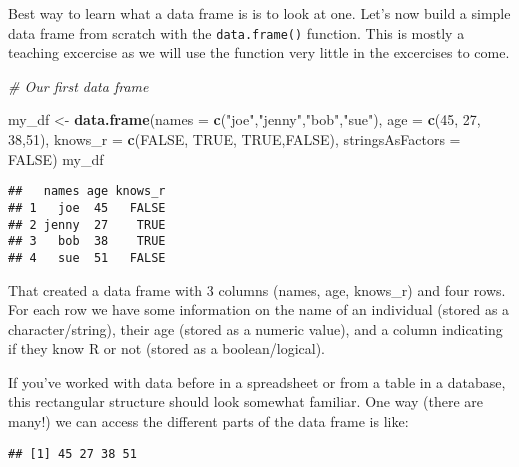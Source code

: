 \documentclass[]{article}
\newenvironment{Shaded}{\begin{snugshade}}{\end{snugshade}}
\newcommand{\CommentTok}[1]{\textcolor[rgb]{0.56,0.35,0.01}{\textit{#1}}}
\newcommand{\DataTypeTok}[1]{\textcolor[rgb]{0.13,0.29,0.53}{#1}}
\newcommand{\DecValTok}[1]{\textcolor[rgb]{0.00,0.00,0.81}{#1}}
\newcommand{\KeywordTok}[1]{\textcolor[rgb]{0.13,0.29,0.53}{\textbf{#1}}}
\newcommand{\NormalTok}[1]{#1}
\newcommand{\OperatorTok}[1]{\textcolor[rgb]{0.81,0.36,0.00}{\textbf{#1}}}
\newcommand{\OtherTok}[1]{\textcolor[rgb]{0.56,0.35,0.01}{#1}}
\newcommand{\StringTok}[1]{\textcolor[rgb]{0.31,0.60,0.02}{#1}}
\begin{document}
Best way to learn what a data frame is is to look at one. Let's now
build a simple data frame from scratch with the \texttt{data.frame()}
function. This is mostly a teaching excercise as we will use the
function very little in the excercises to come.

\begin{Shaded}
\begin{Highlighting}[]
\CommentTok{# Our first data frame}

\NormalTok{my_df <-}\StringTok{ }\KeywordTok{data.frame}\NormalTok{(}\DataTypeTok{names =} \KeywordTok{c}\NormalTok{(}\StringTok{"joe"}\NormalTok{,}\StringTok{"jenny"}\NormalTok{,}\StringTok{"bob"}\NormalTok{,}\StringTok{"sue"}\NormalTok{), }
                    \DataTypeTok{age =} \KeywordTok{c}\NormalTok{(}\DecValTok{45}\NormalTok{, }\DecValTok{27}\NormalTok{, }\DecValTok{38}\NormalTok{,}\DecValTok{51}\NormalTok{), }
                    \DataTypeTok{knows_r =} \KeywordTok{c}\NormalTok{(}\OtherTok{FALSE}\NormalTok{, }\OtherTok{TRUE}\NormalTok{, }\OtherTok{TRUE}\NormalTok{,}\OtherTok{FALSE}\NormalTok{), }
                    \DataTypeTok{stringsAsFactors =} \OtherTok{FALSE}\NormalTok{)}
\NormalTok{my_df}
\end{Highlighting}
\end{Shaded}

\begin{verbatim}
##   names age knows_r
## 1   joe  45   FALSE
## 2 jenny  27    TRUE
## 3   bob  38    TRUE
## 4   sue  51   FALSE
\end{verbatim}

That created a data frame with 3 columns (names, age, knows\_r) and four
rows. For each row we have some information on the name of an individual
(stored as a character/string), their age (stored as a numeric value),
and a column indicating if they know R or not (stored as a
boolean/logical).

If you've worked with data before in a spreadsheet or from a table in a
database, this rectangular structure should look somewhat familiar. One
way (there are many!) we can access the different parts of the data
frame is like:

\begin{Shaded}
\end{Shaded}

\begin{verbatim}
## [1] 45 27 38 51
\end{verbatim}
\end{document}
